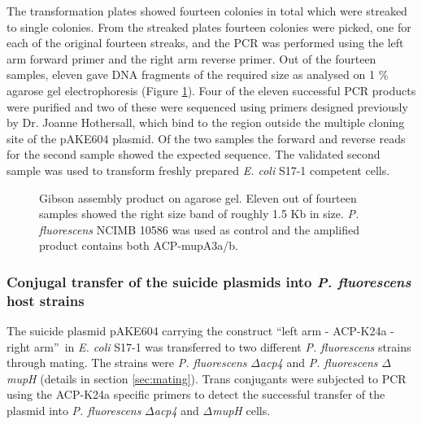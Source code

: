	The transformation plates showed fourteen colonies in total which were streaked to single colonies. From the streaked plates fourteen colonies were picked, one for each of the original fourteen streaks, and the PCR was performed using the left arm forward primer and the right arm reverse primer. Out of the fourteen samples, eleven gave DNA fragments of the required size as analysed on 1 \% agarose gel electrophoresis (Figure \ref{fig:gibsongel}). Four of the eleven successful PCR products were purified and two of these were sequenced using primers designed previously by Dr. Joanne Hothersall, which bind to the region outside the multiple cloning site of the pAKE604 plasmid. Of the two samples the forward and reverse reads for the second sample showed the expected sequence. The validated second sample was used to transform freshly prepared \textit{E. coli} S17-1 competent cells.

		\setlength\fboxsep{5pt}
		\setlength\fboxrule{1.5pt}
		\begin{figure}[htbp]
		\centering
		\caption[Gibson assembly product on agarose gel.]{Gibson assembly product on agarose gel. Eleven out of fourteen samples showed the right size band of roughly 1.5 Kb in size. \textit{P. fluorescens} NCIMB 10586 was used as control and the amplified product contains both ACP-mupA3a/b.}
		\label{fig:gibsongel}
		\end{figure}

	\subsubsection{Conjugal transfer of the suicide plasmids into \textit{P. fluorescens} host strains}
	\label{sec:chap4mating}
	The suicide plasmid pAKE604 carrying the construct \textquotedblleft left arm - ACP-K24a - right arm\textquotedblright \ in \textit{E. coli} S17-1 was transferred to two different \textit{P. fluorescens} strains through mating. The strains were \textit{P. fluorescens} $ \Delta $\textit{acp4} and \textit{P. fluorescens} $ \Delta $\textit{mupH} (details in section \ref{sec:mating}). Trans conjugants were subjected to PCR using the ACP-K24a specific primers to detect the successful transfer of the plasmid into \textit{P. fluorescens} $ \Delta $\textit{acp4} and $\Delta $\textit{mupH} cells.
		
